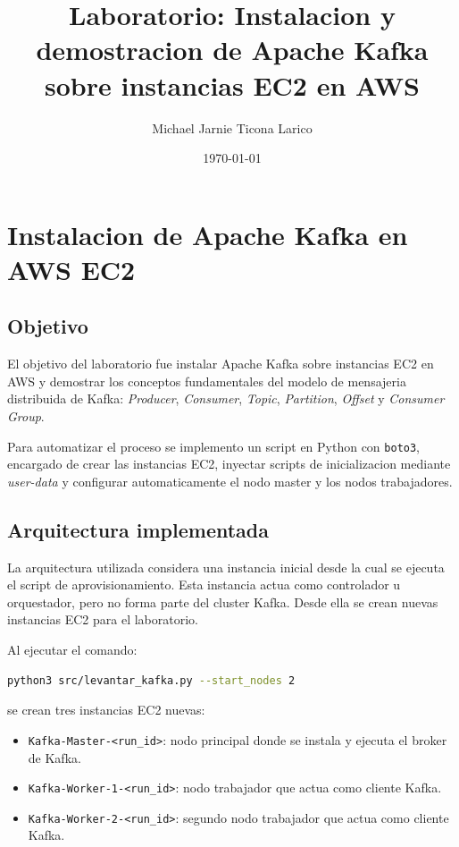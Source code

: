 \documentclass{practicaEPCC}
\title{Laboratorio: Instalacion y demostracion de Apache Kafka sobre instancias EC2 en AWS}
\author{Michael Jarnie Ticona Larico}
\date{\today}
\begin{document}
\maketitle

\section{Instalacion de Apache Kafka en AWS EC2}

\subsection{Objetivo}

El objetivo del laboratorio fue instalar Apache Kafka sobre instancias EC2 en AWS y demostrar los conceptos fundamentales del modelo de mensajeria distribuida de Kafka: \textit{Producer}, \textit{Consumer}, \textit{Topic}, \textit{Partition}, \textit{Offset} y \textit{Consumer Group}.

Para automatizar el proceso se implemento un script en Python con \texttt{boto3}, encargado de crear las instancias EC2, inyectar scripts de inicializacion mediante \textit{user-data} y configurar automaticamente el nodo master y los nodos trabajadores.

\subsection{Arquitectura implementada}

La arquitectura utilizada considera una instancia inicial desde la cual se ejecuta el script de aprovisionamiento. Esta instancia actua como controlador u orquestador, pero no forma parte del cluster Kafka. Desde ella se crean nuevas instancias EC2 para el laboratorio.

Al ejecutar el comando:

\begin{lstlisting}[language=bash]
python3 src/levantar_kafka.py --start_nodes 2
\end{lstlisting}

se crean tres instancias EC2 nuevas:

\begin{itemize}
\item \texttt{Kafka-Master-<run\_id>}: nodo principal donde se instala y ejecuta el broker de Kafka.
\item \texttt{Kafka-Worker-1-<run\_id>}: nodo trabajador que actua como cliente Kafka.
\item \texttt{Kafka-Worker-2-<run\_id>}: segundo nodo trabajador que actua como cliente Kafka.
\end{itemize}
\end{document}
